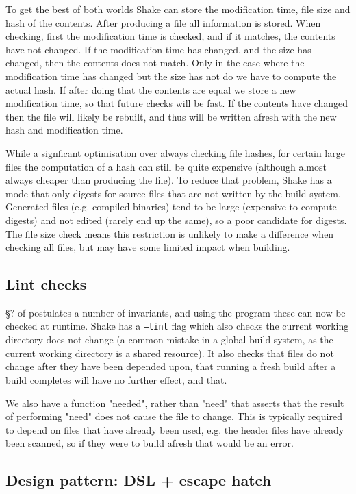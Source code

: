 To get the best of both worlds Shake can store the modification time, file size and hash of the contents. After producing a file all information is stored. When checking, first the modification time is checked, and if it matches, the contents have not changed. If the modification time has changed, and the size has changed, then the contents does not match. Only in the case where the modification time has changed but the size has not do we have to compute the actual hash. If after doing that the contents are equal we store a new modification time, so that future checks will be fast. If the contents have changed then the file will likely be rebuilt, and thus will be written afresh with the new hash and modification time.

While a signficant optimisation over always checking file hashes, for certain large files the computation of a hash can still be quite expensive (although almost always cheaper than producing the file). To reduce that problem, Shake has a mode that only digests for source files that are not written by the build system. Generated files (e.g. compiled binaries) tend to be large (expensive to compute digests) and not edited (rarely end up the same), so a poor candidate for digests. The file size check means this restriction is unlikely to make a difference when checking all files, but may have some limited impact when building.

\subsection{Lint checks}

\S? of \cite{shake} postulates a number of invariants, and using the  program these can now be checked at runtime. Shake has a \texttt{--lint} flag which also checks the current working directory does not change (a common mistake in a global build system, as the current working directory is a shared resource). It also checks that files do not change after they have been depended upon, that running a fresh build after a build completes will have no further effect, and that.

We also have a function \lst"needed", rather than \lst"need" that asserts that the result of performing \lst"need" does not cause the file to change. This is typically required to depend on files that have already been used, e.g. the header files have already been scanned, so if they were to build afresh that would be an error.

\subsection{Design pattern: DSL + escape hatch}

